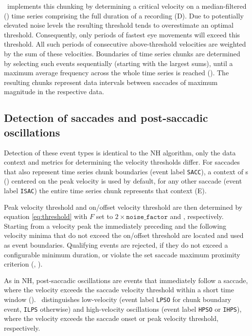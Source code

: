 \remodnav\ implements this chunking by determining a critical velocity on a
median-filtered () time series comprising the
full duration of a recording (D). Due to potentially elevated noise
levels the resulting threshold tends to overestimate an optimal threshold.
Consequently, only periods of fastest eye movements will exceed this threshold.
All such periods of consecutive above-threshold velocities are weighted by the
sum of these velocities. Boundaries of time series chunks are determined by
selecting such events sequentially (starting with the largest sums), until a
maximum average frequency across the whole time series is reached
(). The resulting chunks represent data
intervals between saccades of maximum magnitude in the respective data.


\subsection*{Detection of saccades and post-saccadic oscillations}

Detection of these event types is identical to the NH algorithm, only the data
context and metrics for determining the velocity thresholds differ.  For
saccades that also represent time series chunk boundaries (event label
\texttt{SACC}), a context of \unit[1]{s}
() centered on the peak velocity is
used by default, for any other saccade (event label \texttt{ISAC}) the entire
time series chunk represents that context (E).

Peak velocity threshold and on/offset velocity threshold are then determined by
equation \ref{eq:threshold} with $F$ set to $2\times\mathtt{noise\_factor}$ and
, respectively. Starting from a velocity peak the
immediately preceding and the following velocity minima that do not exceed the
on/offset threshold are located and used as event boundaries. Qualifying events
are rejected, if they do not exceed a configurable minimum duration, or violate
the set saccade maximum proximity criterion (,
).

As in NH, post-saccadic oscillations are events that immediately follow a
saccade, where the velocity exceeds the saccade velocity threshold within a short
time window (). \remodnav\ distinguishes low-velocity
(event label \texttt{LPSO} for chunk boundary event, \texttt{ILPS} otherwise)
and high-velocity oscillations (event label \texttt{HPSO} or \texttt{IHPS}),
where the velocity exceeds the saccade onset or peak velocity threshold,
respectively.

